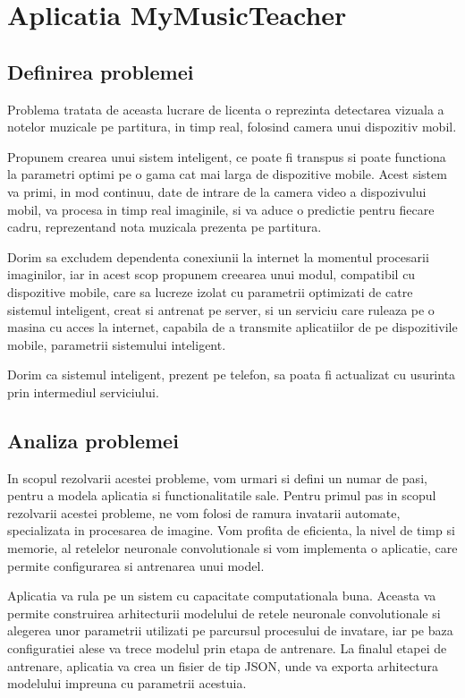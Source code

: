 
\chapter{Aplicatia MyMusicTeacher}

\section{Definirea problemei}
	Problema tratata de aceasta lucrare de licenta o reprezinta detectarea vizuala a notelor muzicale pe partitura, in timp real, folosind camera unui dispozitiv mobil. 
	
	Propunem crearea unui sistem inteligent, ce poate fi transpus si poate functiona la parametri optimi pe o gama cat mai larga de dispozitive mobile. Acest sistem va primi, in mod continuu, date de intrare de la camera video a dispozivului mobil, va procesa in timp real imaginile, si va aduce o predictie pentru fiecare cadru, reprezentand nota muzicala prezenta pe partitura. 
	
	Dorim sa excludem dependenta conexiunii la internet la momentul procesarii imaginilor, iar in acest scop propunem creearea unui modul, compatibil cu dispozitive mobile, care sa lucreze izolat cu parametrii optimizati de catre sistemul inteligent, creat si antrenat pe server, si un serviciu care ruleaza pe o masina cu acces la internet, capabila de a transmite aplicatiilor de pe dispozitivile mobile, parametrii sistemului inteligent. 
	
	Dorim ca sistemul inteligent, prezent pe telefon, sa poata fi actualizat cu usurinta prin intermediul serviciului.  

\section{Analiza problemei}
	In scopul rezolvarii acestei probleme, vom urmari si defini un numar de pasi, pentru a modela aplicatia si functionalitatile sale.
	Pentru primul pas in scopul rezolvarii acestei probleme, ne vom folosi de ramura invatarii automate, specializata in procesarea de imagine. Vom profita de eficienta, la nivel de timp si memorie, al retelelor neuronale convolutionale si vom implementa o aplicatie, care permite configurarea si antrenarea unui model.
	
	Aplicatia va rula pe un sistem cu capacitate computationala buna. Aceasta va permite construirea arhitecturii modelului de retele neuronale convolutionale si  alegerea unor parametrii utilizati pe parcursul procesului de invatare, iar pe baza configuratiei alese  va trece modelul prin etapa de antrenare. La finalul  etapei de antrenare, aplicatia va crea un fisier de tip JSON, unde va exporta arhitectura modelului impreuna cu parametrii acestuia. 
	

